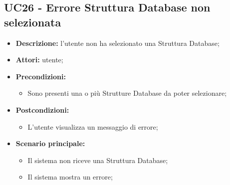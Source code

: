 \subsection{UC26 - Errore Struttura Database non selezionata}
\label{sec:UC26}
\begin{itemize}
	\item \textbf{Descrizione:} l’utente non ha selezionato una Struttura Database;
	\item \textbf{Attori:} utente;
	\item \textbf{Precondizioni:}
	\begin{itemize}
		\item Sono presenti una o più Strutture Database da poter selezionare;
	\end{itemize}
	\item \textbf{Postcondizioni:}
	\begin{itemize}
		\item L’utente visualizza un messaggio di errore;
	\end{itemize}
	\item \textbf{Scenario principale:}
	\begin{itemize}
		\item Il sistema non riceve una Struttura Database;
		\item Il sistema mostra un errore;
	\end{itemize}
\end{itemize}


